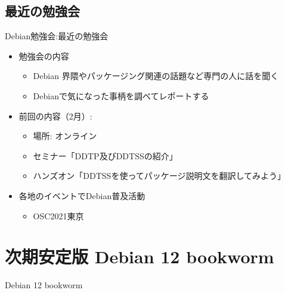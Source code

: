 \subsection{最近の勉強会}


\begin{frame}{Debian勉強会:最近の勉強会}
  
\begin{itemize}
\item 勉強会の内容
  \begin{itemize}
  \item Debian 界隈やパッケージング関連の話題など専門の人に話を聞く
  \item Debianで気になった事柄を調べてレポートする
  \end{itemize}
\item 前回の内容（2月）:
  \begin{itemize}
  \item 場所: オンライン
  \item セミナー「DDTP及びDDTSSの紹介」
  \item ハンズオン「DDTSSを使ってパッケージ説明文を翻訳してみよう」
  \end{itemize}
\item 各地のイベントでDebian普及活動
  \begin{itemize}
  \item OSC2021東京
  \end{itemize}
\end{itemize}

\end{frame}


\section{次期安定版 Debian 12 bookworm}

\begin{frame}
  \begin{center}\Huge{Debian 12 bookworm}\end{center}
\end{frame}



